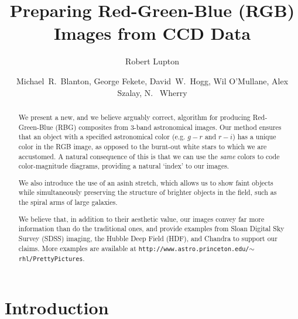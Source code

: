 \documentclass[preprint]{aastex}		%
\newcommand{\asinh}{\textrm{asinh}}
\begin{document}
\title{Preparing Red-Green-Blue (RGB) Images from CCD Data}
\author{Robert Lupton}
\author{%
  Michael~R.~Blanton,
  George Fekete,
  David~W.~Hogg,
  Wil O'Mullane,
  Alex Szalay,
  N.~ Wherry
  }

\begin{abstract}

We present a new, and we believe arguably correct, algorithm for
producing Red-Green-Blue (RBG) composites from 3-band astronomical
images. Our method ensures that an object with a specified
astronomical color (e.g. $g-r$ and $r-i$) has a unique color in the
RGB image, as opposed to the burnt-out white stars to which we are
accustomed. A natural consequence of this is that we can use the
\emph{same} colors to code color-magnitude diagrams, providing a
natural `index' to our images.

We also introduce the use of an $\asinh$ stretch, which allows us to
show faint objects while simultaneously preserving the structure of
brighter objects in the field, such as the spiral arms of large
galaxies.

We believe that, in addition to their aesthetic value, our images
convey far more information than do the traditional ones, and provide
examples from Sloan Digital Sky Survey (SDSS) imaging, the Hubble Deep
Field (HDF), and Chandra to support our claims. More examples are
available at
\texttt{http://www.astro.princeton.edu/$\sim$rhl/PrettyPictures}.

\end{abstract}


\maketitle


\section{Introduction}
\end{document}
